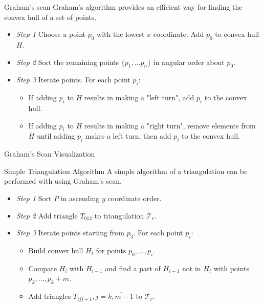 \documentclass[10pt]{beamer}
\begin{document}
\begin{frame}{Graham's scan} 
	\alert{Graham's algorithm} provides an efficient way for finding the convex hull of a set of points.
	\begin{itemize}
			\item \textit{Step 1} Choose a point $p_0$ with the lowest $x$ coordinate. 
							  Add $p_0$ to convex hull $H$.
			\item \textit{Step 2} Sort the remaining points $\lbrace p_1,...p_n\rbrace$ 
							  in angular order about $p_0$.
			\item \textit{Step 3} Iterate points. For each point $p_i$:
				\begin{itemize}
					\item If adding $p_i$ to $H$ results in making a "left turn", 
						  add $p_i$ to the  convex hull.
					\item If adding $p_i$ to $H$ results in making a "right turn", 
						  remove elements from $H$ until adding $p_i$ makes a 
						  left turn, then add $p_i$ to the convex hull. 	  
				\end{itemize}	
	\end{itemize}					
\end{frame}

\begin{frame}{Graham's Scan Visualization}
\end{frame}

\begin{frame}{Simple Triangulation Algorithm}
	A simple algorithm of a triangulation can be performed with using Graham's scan.
	\begin{itemize}
		\item \textit{Step 1} Sort $P$ in ascending $y$ coordinate order.
		\item \textit{Step 2} Add triangle $T_{012}$ to triangulation $ \mathcal{T}_r$.
		\item \textit{Step 3} Iterate points starting from $p_3$. For each point $p_i$:
			\begin{itemize}
				\item Build convex hull $H_i$ for points $p_0,...,p_i$.
				\item Compare $H_i$ with $H_{i-1}$ and find a part of $H_{i-1}$ 
					  not in $H_i$ with points $p_k,...,p_k+m$.
				\item Add triangles $T_{i j j+1}, j=\overline{k,m-1}$ to $ \mathcal{T}_r$.	    
			\end{itemize}
	\end{itemize}
\end{frame}
\end{document}
